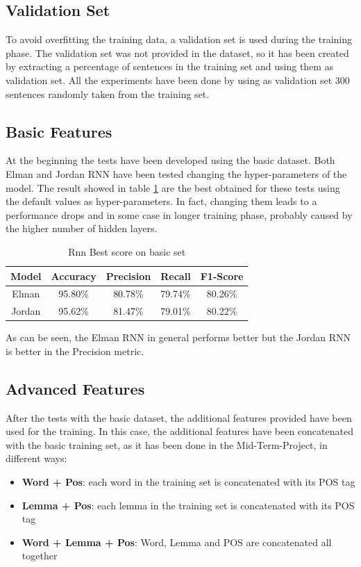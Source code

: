 \documentclass[11pt,a4paper]{article}
\begin{document}
\subsection{Validation Set}
To avoid overfitting the training data, a validation set is used during the training phase. The validation set was not provided in the dataset, so it has been created by extracting a percentage of sentences in the training set and using them as validation set. All the experiments have been done by using as validation set 300 sentences randomly taken from the training set.

\subsection{Basic Features}
At the beginning the tests have been developed using the basic dataset. Both Elman and Jordan RNN have been tested changing the hyper-parameters of the model. The result showed in table \ref{t11} are the best obtained for these tests using the default values as hyper-parameters. In fact, changing them leads to a performance drops and in some case in longer training phase, probably caused by the higher number of hidden layers.
\begin{table}[H]
    \begin{center}
        \begin{tabular}{|c|c|c|c|c|}
            \hline \bf Model &\bf Accuracy &   \bf Precision &  \bf Recall &  \bf F1-Score   \\ \hline
            Elman & 95.80\% & 80.78\% & 79.74\% & 80.26\%\\
            Jordan & 95.62\% & 81.47\% & 79.01\% & 80.22\%\\
            \hline
        \end{tabular}
    \end{center}
    \caption{\label{t11} Rnn Best score on basic set}
\end{table}
As can be seen, the Elman RNN in general performs better but the Jordan RNN is better in the Precision metric.
%
%


\subsection{Advanced Features}
After the tests with the basic dataset, the additional features provided have been used for the training. In this case, the additional features have been concatenated with the basic training set, as it has been done in the Mid-Term-Project,  in different ways:
\begin{itemize}
    \item \textbf{Word + Pos}: each word in the training set is concatenated with its POS tag
    \item \textbf{Lemma + Pos}: each lemma in the training set is concatenated with its POS tag
    \item \textbf{Word + Lemma + Pos}: Word, Lemma and POS are concatenated all together
\end{itemize}
\end{document}
